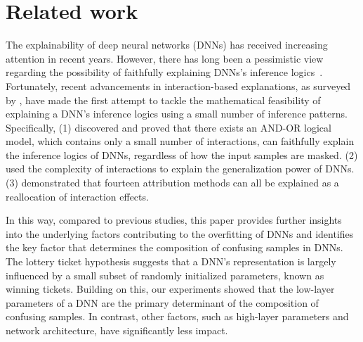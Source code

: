 \section{Related work}
The explainability of deep neural networks (DNNs) has received increasing attention in recent years. However, there has long been a pessimistic view regarding the possibility of faithfully explaining DNNs's inference logics~\citep{dziugaite2017computing, foret2020sharpness, neyshabur2015norm}. Fortunately, recent advancements in interaction-based explanations, as surveyed by \cite{ren2024we}, have made the first attempt to tackle the mathematical feasibility of explaining a DNN's inference logics using a small number of inference patterns. Specifically, (1) \citet{ren2023defining} discovered and \cite{ren2024we} proved that there exists an AND-OR logical model, which contains only a small number of interactions, can faithfully explain the inference logics of DNNs, regardless of how the input samples are masked. (2) \citet{zhou2024explaining} used the complexity of interactions to explain the generalization power of DNNs. (3) \citet{deng2024unifying} demonstrated that fourteen attribution methods can all be explained as a reallocation of interaction effects.

In this way, compared to previous studies, this paper provides further insights into the underlying factors contributing to the overfitting of DNNs and identifies the key factor that determines the composition of confusing samples in DNNs. The lottery ticket hypothesis\cite{frankle2018lottery} suggests that a DNN's representation is largely influenced by a small subset of randomly initialized parameters, known as winning tickets. Building on this, our experiments showed that the low-layer parameters of a DNN are the primary determinant of the composition of confusing samples. In contrast, other factors, such as high-layer parameters and network architecture, have significantly less impact.
